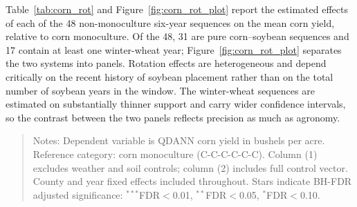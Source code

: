 \documentclass[12pt,letterpaper]{article}
\theoremstyle{remark}
\theoremstyle{remark}
\let\oldtable\table
\let\endoldtable\endtable
\renewenvironment{table}[1][H]{\oldtable[H]}{\endoldtable}
\theoremstyle{plain}
\theoremstyle{definition}
\begin{document}
Table~\ref{tab:corn_rot} and Figure~\ref{fig:corn_rot_plot} report the estimated effects of each of the 48 non-monoculture six-year sequences on the mean corn yield, relative to corn monoculture. Of the 48, 31 are pure corn--soybean sequences and 17 contain at least one winter-wheat year; Figure~\ref{fig:corn_rot_plot} separates the two systems into panels. Rotation effects are heterogeneous and depend critically on the recent history of soybean placement rather than on the total number of soybean years in the window. The winter-wheat sequences are estimated on substantially thinner support and carry wider confidence intervals, so the contrast between the two panels reflects precision as much as agronomy.


\begin{quote}
\small
Notes: Dependent variable is QDANN corn yield in bushels per acre. Reference category: corn monoculture (C-C-C-C-C-C). Column (1) excludes weather and soil controls; column (2) includes full control vector. County and year fixed effects included throughout. Stars indicate BH-FDR adjusted significance: $^{***}$FDR$<$0.01, $^{**}$FDR$<$0.05, $^{*}$FDR$<$0.10.
\end{quote}
\end{document}
